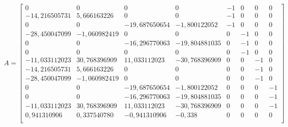 \documentclass[a4paper]{article}
\begin{document}
\small{
\begin{center}
    $A =
    \begin{bmatrix}
        0 & 0 & 0 & 0 & -1 & 0 & 0 & 0 \\
        -14,216505731 & 5,666163226 & 0 & 0 & -1 & 0 & 0 & 0 \\
        0 & 0 & -19,687650654 & -1,800122052 & -1 & 0 & 0 & 0 \\
        -28,450047099 & -1,060982419 & 0 & 0 & 0 & -1 & 0 & 0 \\
        0 & 0 & -16,296770063 & -19,804881035 & 0 & -1 & 0 & 0 \\
        0 & 0 & 0 & 0 & 0 & -1 & 0 & 0 \\
        -11,033112023 & 30,768396909 & 11,033112023 & -30,768396909 & 0 & 0 & -1 & 0 \\
        -14,216505731 & 5,666163226 & 0 & 0 & 0 & 0 & -1 & 0 \\
        -28,450047099 & -1,060982419 & 0 & 0 & 0 & 0 & -1 & 0 \\
        0 & 0 & -19,687650654 & -1,800122052 & 0 & 0 & 0 & -1 \\
        0 & 0 & -16,296770063 & -19,804881035 & 0 & 0 & 0 & -1 \\
        -11,033112023 & 30,768396909 & 11,033112023 & -30,768396909 & 0 & 0 & 0 & -1 \\
        0,941310906 & 0,337540780 & -0,941310906 & -0,338 & 0 & 0 & 0 & 0 \\
    \end{bmatrix}$
\end{center}
}
\end{document}
